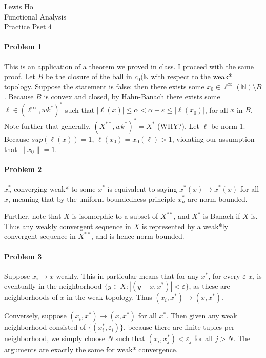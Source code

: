 \documentclass[12pt]{article}
\begin{document}
\begin{center}
  Lewis Ho\\
  Functional Analysis\\
  Practice Pset 4
\end{center}

\paragraph{Problem 1}

This is an application of a theorem we proved in class. I proceed with the same
proof. Let $B$ be the closure of the ball in $c_0(\mathbb{N}$ with respect to
the weak* topology. Suppose the statement is false: then there exists some
$x_0 \in \ell^\infty(\mathbb{N})\setminus B$. Because $B$ is convex and closed,
by Hahn-Banach there exists some $\ell \in (\ell^\infty,wk^*)^*$ such that
$|\ell(x)| \leq \alpha < \alpha + \varepsilon \leq |\ell(x_0)|$, for all $x$
in $B$. Note further that generally, $(X^{**},wk^*)^* = X^*$ (WHY?). Let $\ell$
be norm 1. Because $sup(\ell(x)) = 1$, $\ell(x_0) = x_0(\ell) > 1$, violating
our assumption that $\|x_0\| = 1$.

\paragraph{Problem 2}

$x^*_n$ converging weak* to some $x^*$ is equivalent to saying $x^*(x)\to x^*(x)$
for all $x$, meaning that by the uniform boundedness principle $x^*_n$ are norm
bounded.

Further, note that $X$ is isomorphic to a subset of $X^{**}$, and $X^*$ is Banach
if $X$ is. Thus any weakly convergent sequence in $X$ is represented by a
weak*ly convergent sequence in $X^{**}$, and is hence norm bounded.

\paragraph{Problem 3}

Suppose $x_i\to x$ weakly. This in particular means that for any $x^*$, for
every $\varepsilon$ $x_i$ is eventually in the neighborhood $\{y\in X: |(y-x,
x^*)| < \varepsilon\}$, as these are neighborhoods of $x$ in the weak topology.
Thus $(x_i,x^*) \to (x,x^*)$.

Conversely, suppose $(x_i,x^*)\to (x,x^*)$ for all $x^*$. Then given any
weak neighborhood consisted of $\{(x^*_i,\varepsilon_i)\}$, because there
are finite tuples per neighborhood, we simply choose $N$ such that $(x_i, x^*_j)
< \varepsilon_j$ for all $j>N$. The arguments are exactly the same for
weak* convergence.
\end{document}
